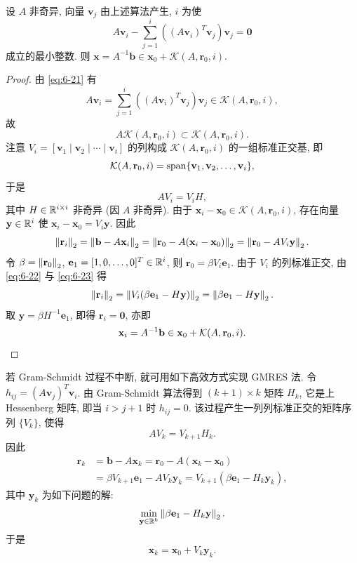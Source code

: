 \begin{theorem}
\label{thm:6-14}
设 $A$ 非奇异, 向量 $\mathbf{v}_j$ 由上述算法产生, $i$ 为使
\begin{equation}
  A\mathbf{v}_i-\sum_{j=1}^{i}((A\mathbf{v}_i)^T\mathbf{v}_j)\mathbf{v}_j
  =\mathbf{0}
  \label{eq:6-21}
\end{equation}
成立的最小整数. 则 $\mathbf{x}=A^{-1}\mathbf{b}
\in\mathbf{x}_0+\mathcal{K}(A,\mathbf{r}_0,i)$.
\end{theorem}

\begin{proof}
由 \eqref{eq:6-21} 有
\[
  A\mathbf{v}_i=\sum_{j=1}^{i}((A\mathbf{v}_i)^T\mathbf{v}_j)\mathbf{v}_j
  \in\mathcal{K}(A,\mathbf{r}_0,i),
\]
故
\[
  A\mathcal{K}(A,\mathbf{r}_0,i)\subset\mathcal{K}(A,\mathbf{r}_0,i).
\]
注意 $V_i=[\mathbf{v}_1\mid\mathbf{v}_2\mid\cdots\mid\mathbf{v}_i]$ 的列构成 $\mathcal{K}(A,\mathbf{r}_0,i)$ 的一组标准正交基, 即
\[
  \mathcal{K}(A,\mathbf{r}_0,i)=\operatorname{span}\{\mathbf{v}_1,\mathbf{v}_2,\ldots,\mathbf{v}_i\},
\]
于是
\begin{equation}
  AV_i=V_iH,
  \label{eq:6-22}
\end{equation}
其中 $H\in\mathbb{R}^{i\times i}$ 非奇异 (因 $A$ 非奇异). 由于 $\mathbf{x}_i-\mathbf{x}_0
\in\mathcal{K}(A,\mathbf{r}_0,i)$, 存在向量 $\mathbf{y}\in\mathbb{R}^i$ 使 $\mathbf{x}_i-\mathbf{x}_0=V_i\mathbf{y}$. 因此
\begin{equation}
  \left\|\mathbf{r}_i\right\|_2=\left\|\mathbf{b}-A\mathbf{x}_i\right\|_2
  =\left\|\mathbf{r}_0-A(\mathbf{x}_i-\mathbf{x}_0)\right\|_2
  =\left\|\mathbf{r}_0-AV_i\mathbf{y}\right\|_2.
  \label{eq:6-23}
\end{equation}
令 $\beta=\left\|\mathbf{r}_0\right\|_2$, $\mathbf{e}_1=[1,0,\ldots,0]^T\in\mathbb{R}^i$, 则 $\mathbf{r}_0=\beta V_i\mathbf{e}_1$. 由于 $V_i$ 的列标准正交, 由 \eqref{eq:6-22} 与 \eqref{eq:6-23} 得
\[
  \left\|\mathbf{r}_i\right\|_2=\left\|V_i(\beta\mathbf{e}_1-H\mathbf{y})\right\|_2
  =\left\|\beta\mathbf{e}_1-H\mathbf{y}\right\|_2.
\]
取 $\mathbf{y}=\beta H^{-1}\mathbf{e}_1$, 即得 $\mathbf{r}_i=\mathbf{0}$, 亦即
\[
  \mathbf{x}_i=A^{-1}\mathbf{b}\in\mathbf{x}_0+\mathcal{K}(A,\mathbf{r}_0,i).
  \qedhere
\]
\end{proof}

若 Gram-Schmidt 过程不中断, 就可用如下高效方式实现 GMRES 法. 令 $h_{ij}=(A\mathbf{v}_j)^T\mathbf{v}_i$. 由 Gram-Schmidt 算法得到 $(k+1)\times k$ 矩阵 $H_k$, 它是上 Hessenberg 矩阵, 即当 $i>j+1$ 时 $h_{ij}=0$. 该过程产生一列列标准正交的矩阵序列 $\{V_k\}$, 使得
\[
  AV_k=V_{k+1}H_k.
\]
因此
\[
  \begin{aligned}
    \mathbf{r}_k&=\mathbf{b}-A\mathbf{x}_k
    =\mathbf{r}_0-A(\mathbf{x}_k-\mathbf{x}_0)\\
    &=\beta V_{k+1}\mathbf{e}_1-AV_k\mathbf{y}_k
    =V_{k+1}(\beta\mathbf{e}_1-H_k\mathbf{y}_k),
  \end{aligned}
\]
其中 $\mathbf{y}_k$ 为如下问题的解:
\[
  \min_{\mathbf{y}\in\mathbb{R}^k}\left\|\beta\mathbf{e}_1-H_k\mathbf{y}\right\|_2.
\]
于是
\[
  \mathbf{x}_k=\mathbf{x}_0+V_k\mathbf{y}_k.
\]

